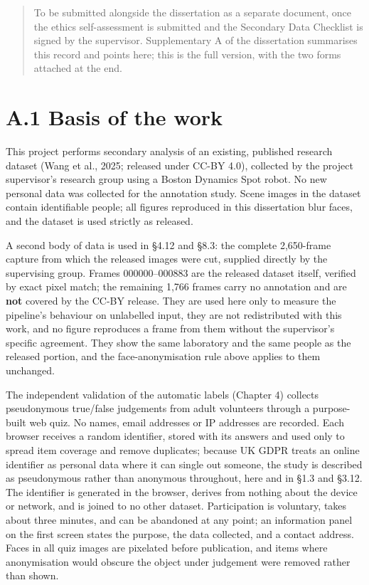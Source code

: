 

\begin{quote}
To be submitted alongside the dissertation as a separate document, once the ethics self-assessment is submitted and the Secondary Data Checklist is signed by the supervisor. Supplementary A of the dissertation summarises this record and points here; this is the full version, with the two forms attached at the end.
\end{quote}

\section{A.1 Basis of the work}

This project performs secondary analysis of an existing, published research dataset (Wang et al., 2025; released under CC-BY 4.0), collected by the project supervisor's research group using a Boston Dynamics Spot robot. No new personal data was collected for the annotation study. Scene images in the dataset contain identifiable people; all figures reproduced in this dissertation blur faces, and the dataset is used strictly as released.

A second body of data is used in \S{}4.12 and \S{}8.3: the complete 2,650-frame capture from which the released images were cut, supplied directly by the supervising group. Frames 000000--000883 are the released dataset itself, verified by exact pixel match; the remaining 1,766 frames carry no annotation and are \textbf{not} covered by the CC-BY release. They are used here only to measure the pipeline's behaviour on unlabelled input, they are not redistributed with this work, and no figure reproduces a frame from them without the supervisor's specific agreement. They show the same laboratory and the same people as the released portion, and the face-anonymisation rule above applies to them unchanged.

The independent validation of the automatic labels (Chapter 4) collects pseudonymous true/false judgements from adult volunteers through a purpose-built web quiz. No names, email addresses or IP addresses are recorded. Each browser receives a random identifier, stored with its answers and used only to spread item coverage and remove duplicates; because UK GDPR treats an online identifier as personal data where it can single out someone, the study is described as pseudonymous rather than anonymous throughout, here and in \S{}1.3 and \S{}3.12. The identifier is generated in the browser, derives from nothing about the device or network, and is joined to no other dataset. Participation is voluntary, takes about three minutes, and can be abandoned at any point; an information panel on the first screen states the purpose, the data collected, and a contact address. Faces in all quiz images are pixelated before publication, and items where anonymisation would obscure the object under judgement were removed rather than shown.


